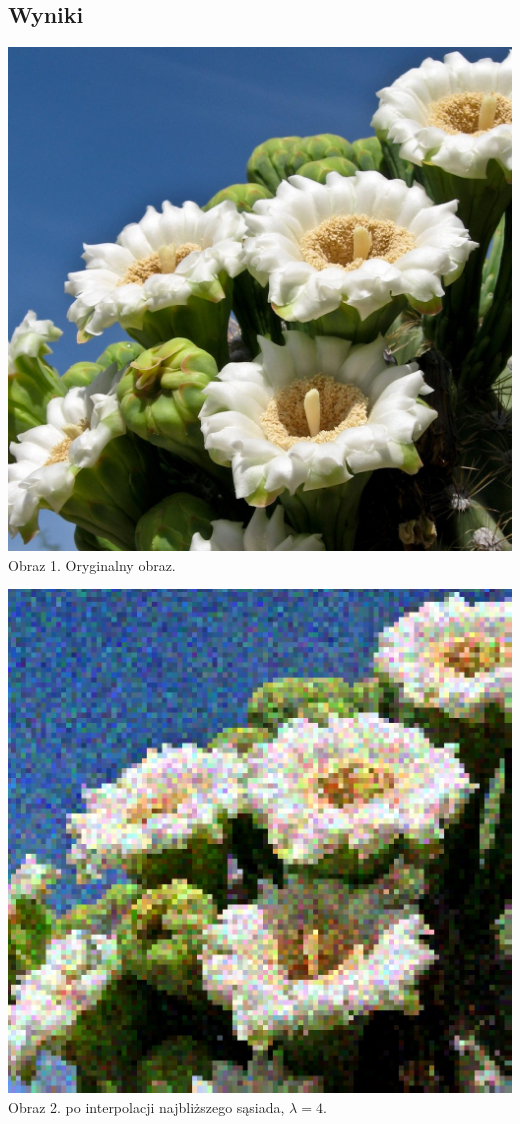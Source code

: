 \documentclass[14pt]{article}
\begin{document}
\subsection{Wyniki}
\vspace{1cm}
\begin{center}
    \includegraphics[scale=0.2]{images/cactus.jpg}
    \\ \small Obraz 1. Oryginalny obraz.

    \vspace{0.5cm}
    \includegraphics[scale=0.15]{images/Poisson_nearest_4x.jpg}
    \\ \small Obraz 2. po interpolacji najbliższego sąsiada, 
    $\lambda = 4$.


\end{center}
\end{document}
